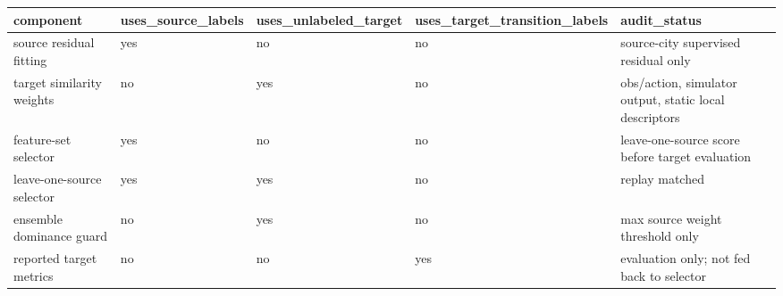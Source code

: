 \begin{tabular}{lllll}
\toprule
component & uses\_source\_labels & uses\_unlabeled\_target & uses\_target\_transition\_labels & audit\_status \\
\midrule
source residual fitting & yes & no & no & source-city supervised residual only \\
target similarity weights & no & yes & no & obs/action, simulator output, static local descriptors \\
feature-set selector & yes & no & no & leave-one-source score before target evaluation \\
leave-one-source selector & yes & yes & no & replay matched \\
ensemble dominance guard & no & yes & no & max source weight threshold only \\
reported target metrics & no & no & yes & evaluation only; not fed back to selector \\
\bottomrule
\end{tabular}
